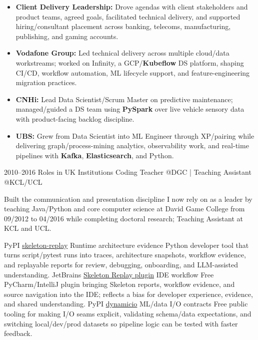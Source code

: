 \documentclass[]{../../friggeri-cv}
\begin{document}
\begin{entrylist}
{{        }
        \begin{itemize}[leftmargin=1.1em]
            \item \footnotesize\textbf{Client Delivery Leadership:} Drove agendas with client stakeholders and product teams, agreed goals, facilitated technical delivery, and supported hiring/consultant placement across banking, telecoms, manufacturing, publishing, and gaming accounts.
            \item \footnotesize\textbf{Vodafone Group:} Led technical delivery across multiple cloud/data workstreams; worked on Infinity, a GCP/\textbf{Kubeflow} DS platform, shaping CI/CD, workflow automation, ML lifecycle support, and feature-engineering migration practices.
            \item \footnotesize\textbf{CNHi:} Lead Data Scientist/Scrum Master on predictive maintenance; managed/guided a DS team using \textbf{PySpark} over live vehicle sensory data with product-facing backlog discipline.
            \item \footnotesize\textbf{UBS:} Grew from Data Scientist into ML Engineer through XP/pairing while delivering graph/process-mining analytics, observability work, and real-time pipelines with \textbf{Kafka}, \textbf{Elasticsearch}, and Python.
        \end{itemize}
    }
    \entry
    {2010--2016}
    {Roles in UK Institutions}
    {\small Coding Teacher @DGC | Teaching Assistant @KCL/UCL}
    {
        {\small
        \setlength{\parindent}{0pt}
        \setlength{\leftskip}{0pt}
        Built the communication and presentation discipline I now rely on as a leader by teaching Java/Python and core computer science at David Game College from 09/2012 to 04/2016 while completing doctoral research; Teaching Assistant at KCL and UCL.

        }
    }
\end{entrylist}
\newpage
\setlength{\parskip}{2pt}
\setlength{\parsep}{0pt}
\begin{entrylist2}
    \entrytwo
        {\small PyPI}
        {\small \href{https://pypi.org/project/skeleton-replay/}{skeleton-replay}}
        {\small Runtime architecture evidence}
        {\footnotesize Python developer tool that turns script/pytest runs into traces, architecture snapshots, workflow evidence, and replayable reports for review, debugging, onboarding, and LLM-assisted understanding.}
    \entrytwo
        {\small JetBrains}
        {\small \href{https://plugins.jetbrains.com/plugin/32807-skeleton-replay}{Skeleton Replay plugin}}
        {\small IDE workflow}
        {\footnotesize Free PyCharm/IntelliJ plugin bringing Skeleton reports, workflow evidence, and source navigation into the IDE; reflects a bias for developer experience, evidence, and shared understanding.}
    \entrytwo
        {\small PyPI}
        {\small \href{https://pypi.org/project/dynamicio/}{dynamicio}}
        {\small ML/data I/O contracts}
        {\footnotesize Free public tooling for making I/O seams explicit, validating schema/data expectations, and switching local/dev/prod datasets so pipeline logic can be tested with faster feedback.}
\end{entrylist2}
\end{document}
